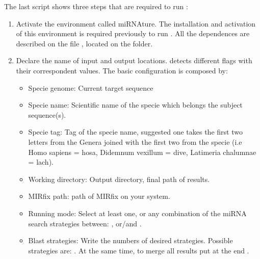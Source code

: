 \documentclass[letterpaper,10pt,english]{sphinxmanual}
\begin{document}
The last script shows three steps that are required to run :
\begin{enumerate}
%
\item {} 
Activate the  environment called miRNAture. The installation and
activation of this environment is required previously to run .
All the dependences are described on the file , located on
the  folder.

\item {} 
Declare the name of input and output locations.  detects
different flags with their correspondent values. The basic configuration is
composed by:
\begin{itemize}
\item {} 
Specie genome: Current target sequence

\item {} 
Specie name: Scientific name of the specie which belongs the subject
sequence(s).

\item {} 
Specie tag: Tag of the specie name, suggested one takes the first two
letters from the Genera joined with the first two from the specie (i.e Homo
sapiens = hosa, Didemnum vexillum = dive, Latimeria chalumnae = lach).

\item {} 
Working directory: Output directory, final path of  results.

\item {} 
MIRfix path: path of MIRfix on your system.

\item {} 
Running mode: Select at least one, or any combination of the miRNA search strategies between:
,  or/and .

\item {} 
Blast strategies: Write the numbers of desired  strategies.
Possible strategies are: . At the same time, to merge all results
put at the end .


\end{itemize}
\end{enumerate}
\end{document}
